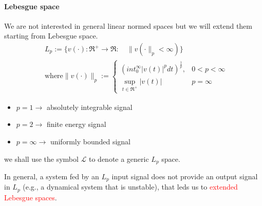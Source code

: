 \paragraph{Lebesgue space}
We are not interested in general linear normed spaces but we will extend them starting from Lebesgue space.
\[
\begin{aligned}
	&L_p:=\{v(\cdot):\Re^+\to\Re:\quad \|v(\cdot\|_p<\infty)\}\\
	&\text{where} \|v(\cdot)\|_p:=\begin{cases}
	\left(	int_{0}^{\infty}|v(t)|^pdt\right)^{\frac{1}{p}},& 0<p<\infty\\
	\sup_{t\in\Re^+}|v(t)|&p=\infty
	\end{cases}
\end{aligned}
\]
\begin{itemize}
	\item $p=1 \to$ absolutely integrable signal
	\item $p=2 \to$ finite energy signal
	\item $p=\infty	\to$  uniformly bounded signal
\end{itemize}
\begin{note}
	we shall use the symbol $\mathcal{L}$ to denote a generic $L_p$ space.
\end{note}








In general, a system fed by an $L_p$ input signal does not provide an output signal in $L_p$ (e.g., a dynamical system that is unstable), that leds us to \textcolor{red}{extended Lebesgue spaces}.
